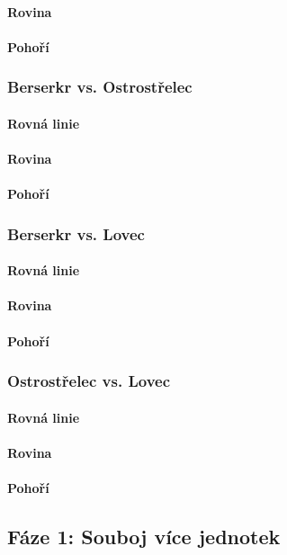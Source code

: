 \paragraph{Rovina}

\paragraph{Pohoří}

\subsubsection{Berserkr vs. Ostrostřelec}

\paragraph{Rovná linie}

\paragraph{Rovina}

\paragraph{Pohoří}

\subsubsection{Berserkr vs. Lovec}

\paragraph{Rovná linie}

\paragraph{Rovina}

\paragraph{Pohoří}

\subsubsection{Ostrostřelec vs. Lovec}

\paragraph{Rovná linie}

\paragraph{Rovina}

\paragraph{Pohoří}

\subsection{Fáze 1: Souboj více jednotek}
